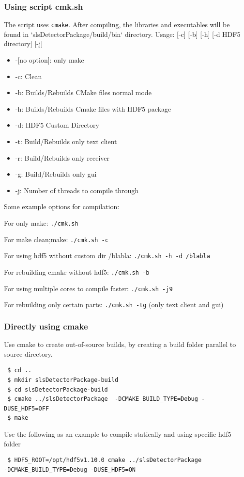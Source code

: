 \documentclass{article}
\begin{document}
\subsubsection{Using script cmk.sh}
The script uses \verb=cmake=. After compiling, the libraries and executables
will be found in `slsDetectorPackage/build/bin` directory.
Usage: [-c] [-b] [-h] [-d HDF5 directory] [-j]
\begin{itemize}
 \item -[no option]: only make
 \item -c: Clean
 \item -b: Builds/Rebuilds CMake files normal mode
 \item -h: Builds/Rebuilds Cmake files with HDF5 package
 \item -d: HDF5 Custom Directory
 \item -t: Build/Rebuilds only text client
 \item -r: Build/Rebuilds only receiver
 \item -g: Build/Rebuilds only gui
 \item -j: Number of threads to compile through
\end{itemize}

Some example options for compilation:

For only make: \verb=./cmk.sh=

For make clean;make: \verb=./cmk.sh -c=

For using hdf5 without custom dir /blabla: \verb=./cmk.sh -h -d /blabla=

For rebuilding cmake without hdf5: \verb=./cmk.sh -b=

For using multiple cores to compile faster: \verb=./cmk.sh -j9=

For rebuilding only certain parts: \verb=./cmk.sh -tg= (only text client and
gui)


\subsubsection{Directly using cmake}

Use cmake to create out-of-source builds, by creating a build folder parallel to
source directory. 
\begin{verbatim}
 $ cd ..
 $ mkdir slsDetectorPackage-build
 $ cd slsDetectorPackage-build
 $ cmake ../slsDetectorPackage  -DCMAKE_BUILD_TYPE=Debug -DUSE_HDF5=OFF 
 $ make
\end{verbatim}

Use the following as an example to compile statically and using specific hdf5
folder 
\begin{verbatim}
 $ HDF5_ROOT=/opt/hdf5v1.10.0 cmake ../slsDetectorPackage
-DCMAKE_BUILD_TYPE=Debug -DUSE_HDF5=ON
\end{verbatim}
\end{document}
